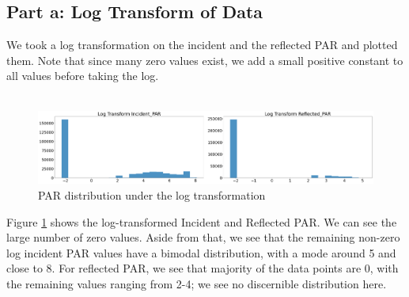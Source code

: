 \documentclass[11pt, letterpaper]{article}
\begin{document}
\subsection{Part a: Log Transform of Data}
We took a log transformation on the incident and the reflected PAR and plotted them. Note that since many zero values exist, we add a small positive constant to all values before taking the log.
\\ \\
\begin{figure}[h!]
\centering
\includegraphics[width=1.0\textwidth]{Fig5_graph_critique_a.png}
\caption{PAR distribution under the log transformation}
\label{fig:graph_crtique_a}
\end{figure}
Figure \ref{fig:graph_crtique_a} shows the log-transformed Incident and Reflected PAR. We can see the large number of zero values. Aside from that, we see that the remaining non-zero log incident PAR values have a bimodal distribution, with a mode around 5 and close to 8. For reflected PAR, we see that majority of the data points are 0, with the remaining values ranging from 2-4; we see no discernible distribution here.
\end{document}
